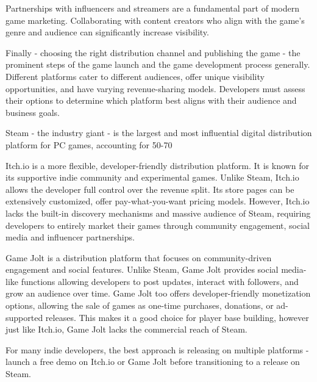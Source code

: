 Partnerships with influencers and streamers are a fundamental part of modern game marketing. Collaborating with content creators who align with the game’s genre and audience can significantly increase visibility.

Finally - choosing the right distribution channel and publishing the game - the prominent steps of the game launch and the game development process generally. Different platforms cater to different audiences, offer unique visibility opportunities, and have varying revenue-sharing models. Developers must assess their options to determine which platform best aligns with their audience and business goals.

Steam - the industry giant - is the largest and most influential digital distribution platform for PC games, accounting for 50-70%

Itch.io is a more flexible, developer-friendly distribution platform. It is known for its supportive indie community and experimental games. Unlike Steam, Itch.io allows the developer full control over the revenue split. Its store pages can be extensively customized, offer pay-what-you-want pricing models. However, Itch.io lacks the built-in discovery mechanisms and massive audience of Steam, requiring developers to entirely market their games through community engagement, social media and influencer partnerships.

Game Jolt is a distribution platform that focuses on community-driven engagement and social features. Unlike Steam, Game Jolt provides social media-like functions allowing developers to post updates, interact with followers, and grow an audience over time. Game Jolt too offers developer-friendly monetization options, allowing the sale of games as one-time purchases, donations, or ad-supported releases. This makes it a good choice for player base building, however just like Itch.io, Game Jolt lacks the commercial reach of Steam.

For many indie developers, the best approach is releasing on multiple platforms - launch a free demo on Itch.io or Game Jolt before transitioning to a release on Steam.

